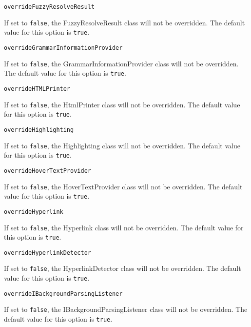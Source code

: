\noindent\texttt{overrideFuzzyResolveResult}
\begin{myindentpar}{1cm}
If set to \texttt{false}, the FuzzyResolveResult class will not be overridden. The default value for this option is \texttt{true}.
\end{myindentpar}

\noindent\texttt{overrideGrammarInformationProvider}
\begin{myindentpar}{1cm}
If set to \texttt{false}, the GrammarInformationProvider class will not be overridden. The default value for this option is \texttt{true}.
\end{myindentpar}

\noindent\texttt{overrideHTMLPrinter}
\begin{myindentpar}{1cm}
If set to \texttt{false}, the HtmlPrinter class will not be overridden. The default value for this option is \texttt{true}.
\end{myindentpar}

\noindent\texttt{overrideHighlighting}
\begin{myindentpar}{1cm}
If set to \texttt{false}, the Highlighting class will not be overridden. The default value for this option is \texttt{true}.
\end{myindentpar}

\noindent\texttt{overrideHoverTextProvider}
\begin{myindentpar}{1cm}
If set to \texttt{false}, the HoverTextProvider class will not be overridden. The default value for this option is \texttt{true}.
\end{myindentpar}

\noindent\texttt{overrideHyperlink}
\begin{myindentpar}{1cm}
If set to \texttt{false}, the Hyperlink class will not be overridden. The default value for this option is \texttt{true}.
\end{myindentpar}

\noindent\texttt{overrideHyperlinkDetector}
\begin{myindentpar}{1cm}
If set to \texttt{false}, the HyperlinkDetector class will not be overridden. The default value for this option is \texttt{true}.
\end{myindentpar}

\noindent\texttt{overrideIBackgroundParsingListener}
\begin{myindentpar}{1cm}
If set to \texttt{false}, the IBackgroundParsingListener class will not be overridden. The default value for this option is \texttt{true}.
\end{myindentpar}

